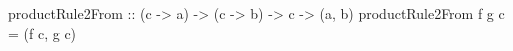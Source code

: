 \begin{code}
productRule2From
    :: (c -> a)
    -> (c -> b)
    -> c
    -> (a, b)
productRule2From f g c = (f c, g c)
\end{code}
